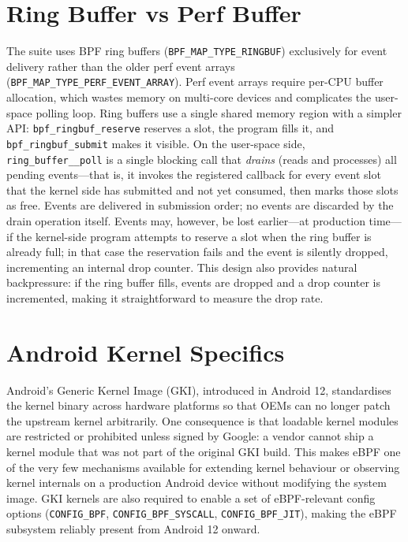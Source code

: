 \documentclass{mnitjaipur}
\begin{document}
\section{Ring Buffer vs Perf Buffer}
The suite uses BPF ring buffers (\texttt{BPF\_MAP\_TYPE\_RINGBUF}) exclusively for event delivery rather than the older perf event arrays (\texttt{BPF\_MAP\_TYPE\_PERF\_EVENT\_ARRAY}). Perf event arrays require per-CPU buffer allocation, which wastes memory on multi-core devices and complicates the user-space polling loop. Ring buffers use a single shared memory region with a simpler API: \texttt{bpf\_ringbuf\_reserve} reserves a slot, the program fills it, and \texttt{bpf\_ringbuf\_submit} makes it visible. On the user-space side, \texttt{ring\_buffer\_\_poll} is a single blocking call that \emph{drains} (reads and processes) all pending events---that is, it invokes the registered callback for every event slot that the kernel side has submitted and not yet consumed, then marks those slots as free. Events are delivered in submission order; no events are discarded by the drain operation itself. Events may, however, be lost earlier---at production time---if the kernel-side program attempts to reserve a slot when the ring buffer is already full; in that case the reservation fails and the event is silently dropped, incrementing an internal drop counter. This design also provides natural backpressure: if the ring buffer fills, events are dropped and a drop counter is incremented, making it straightforward to measure the drop rate.

\section{Android Kernel Specifics}
Android's Generic Kernel Image (GKI), introduced in Android 12, standardises the kernel binary across hardware platforms so that OEMs can no longer patch the upstream kernel arbitrarily. One consequence is that loadable kernel modules are restricted or prohibited unless signed by Google: a vendor cannot ship a kernel module that was not part of the original GKI build. This makes eBPF one of the very few mechanisms available for extending kernel behaviour or observing kernel internals on a production Android device without modifying the system image. GKI kernels are also required to enable a set of eBPF-relevant config options (\texttt{CONFIG\_BPF}, \texttt{CONFIG\_BPF\_SYSCALL}, \texttt{CONFIG\_BPF\_JIT}), making the eBPF subsystem reliably present from Android 12 onward.\cite{android_gki,android_ebpf_monitor}
\end{document}
